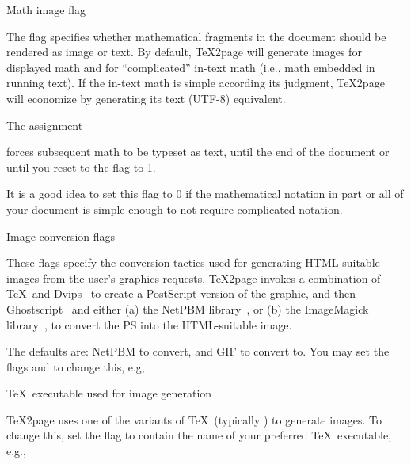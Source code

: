 \beginsection Math image flag

The \p{\TZPmathimage} flag
specifies whether mathematical fragments in the
document should be rendered as image or text.  By default, \TeX2page will
generate images for displayed math and for “complicated”
in-text math (i.e., math embedded in running text).   If the
in-text math is simple according its judgment, \TeX2page will
economize by generating its text (UTF-8) equivalent.

The assignment

forces subsequent math to be typeset as text, until the end of the document or
until you reset to the flag to 1.

It is a good idea to set this flag to 0 if the
mathematical notation in part or all of your document is simple enough to
not require complicated notation.

\beginsection Image conversion flags

%
These flags specify the conversion tactics used
for generating HTML-suitable images from the user’s graphics
requests.  \TeX2page invokes a combination of \TeX\ and
Dvips~\cite{dvips} to create a PostScript version of the
graphic, and then Ghostscript~\cite{gs} and either (a) the
NetPBM library~\cite{netpbm}, or (b) the ImageMagick
library~\cite{imagemagick}, to convert the PS into the
HTML-suitable image.

The defaults are: NetPBM
to convert, and GIF to convert to.
You may set the flags \p{\TZPimageconverter} and \p{\TZPimageformat} to
change this, e.g,


\beginsection \TeX\ executable used for image generation

\TeX2page uses one of the variants of \TeX\ (typically ) to
generate images. To change this, set the flag \p{\TZPtexprogname} to
contain the name of your preferred \TeX\ executable, e.g.,

